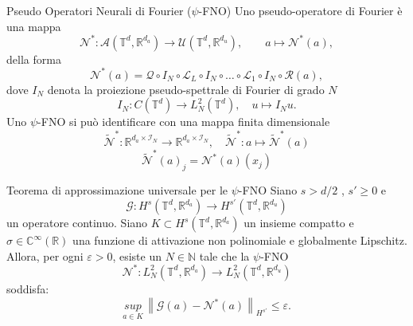 \documentclass{beamer}
\newcommand{\numberset}{\mathbb}
\newcommand{\N}{\numberset{N}}
\newcommand{\R}{\numberset{R}}
\newcommand{\C}{\numberset{C}}
\begin{document}

\begin{frame}{Pseudo Operatori Neurali di Fourier ($ \psi $-FNO)}
	Uno pseudo-operatore di Fourier è una mappa
	\[ \mathcal{N}^{*}: \mathcal{A}(\mathbb{T}^d, \R^{d_a}) \to \mathcal{U}(\mathbb{T}^d, \R^{d_u}), \qquad a \mapsto \mathcal{N}^{*}(a), \]
	della forma
	\[\mathcal{N}^{*}(a) = \mathcal{Q} \circ I_N \circ \mathcal{L}_L \circ I_N \circ \dots \circ \mathcal{L}_1 \circ I_N \circ \mathcal{R}(a),	\]
	dove $ I_N $ denota la proiezione pseudo-spettrale di Fourier di grado $ N $
	\[ I_N : C(\mathbb{T}^d) \to L^{2}_{N}(\mathbb{T}^{d}), \quad u \mapsto I_Nu. \]
	Uno $ \psi $-FNO si può identificare con una mappa finita dimensionale
	\[ \widetilde{\mathcal{N}}^{*}: \R^{d_a \times \mathcal{I}_N} \to \R^{d_a \times \mathcal{I}_N}, \quad \widetilde{\mathcal{N}}^{*}:a \mapsto \widetilde{\mathcal{N}}^{*}(a)  \]
	\[ \widetilde{\mathcal{N}}^{*}(a)_j = \mathcal{N}^{*}(a)(x_j) \]
\end{frame}

\begin{frame}
	\vspace{-0.2cm}
	\begin{themedTitleBlock}{Teorema di approssimazione universale per le $ \psi $-FNO } %
		Siano $ s > d/2$ , $ s' \ge 0 $ e 
		\[ \mathcal{G}: H^s(\mathbb{T}^d, \R^{d_a}) \to H^{s'}(\mathbb{T}^d, \R^{d_u}) \]
		un operatore continuo. Siano $ K \subset H^s(\mathbb{T}^d, \R^{d_a}) $ un insieme compatto e $ \sigma \in \C^{\infty}(\R) $ una funzione di attivazione non polinomiale e globalmente Lipschitz. Allora, per ogni $ \varepsilon > 0 $, esiste un $ N \in \N $ tale che la $ \psi $-FNO 
		\[ \mathcal{N}^{*}: L^2_N(\mathbb{T}^d, \R^{d_a}) \to L^2_N(\mathbb{T}^d, \R^{d_u}) \]
		soddisfa:
		\[ \underset{a \in K}{sup}\, \left\| \mathcal{G}(a) - \mathcal{N}^{*}(a) \right\|_{H^{s'}} \le \varepsilon.  \]
	\end{themedTitleBlock}	
\end{frame}
\end{document}

